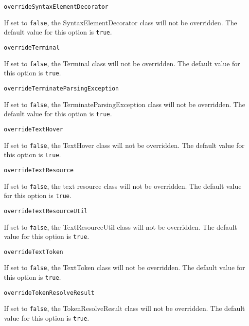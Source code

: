 \noindent\texttt{overrideSyntaxElementDecorator}
\begin{myindentpar}{1cm}
If set to \texttt{false}, the SyntaxElementDecorator class will not be overridden. The default value for this option is \texttt{true}.
\end{myindentpar}

\noindent\texttt{overrideTerminal}
\begin{myindentpar}{1cm}
If set to \texttt{false}, the Terminal class will not be overridden. The default value for this option is \texttt{true}.
\end{myindentpar}

\noindent\texttt{overrideTerminateParsingException}
\begin{myindentpar}{1cm}
If set to \texttt{false}, the TerminateParsingException class will not be overridden. The default value for this option is \texttt{true}.
\end{myindentpar}

\noindent\texttt{overrideTextHover}
\begin{myindentpar}{1cm}
If set to \texttt{false}, the TextHover class will not be overridden. The default value for this option is \texttt{true}.
\end{myindentpar}

\noindent\texttt{overrideTextResource}
\begin{myindentpar}{1cm}
If set to \texttt{false}, the text resource class will not be overridden. The default value for this option is \texttt{true}.
\end{myindentpar}

\noindent\texttt{overrideTextResourceUtil}
\begin{myindentpar}{1cm}
If set to \texttt{false}, the TextResourceUtil class will not be overridden. The default value for this option is \texttt{true}.
\end{myindentpar}

\noindent\texttt{overrideTextToken}
\begin{myindentpar}{1cm}
If set to \texttt{false}, the TextToken class will not be overridden. The default value for this option is \texttt{true}.
\end{myindentpar}

\noindent\texttt{overrideTokenResolveResult}
\begin{myindentpar}{1cm}
If set to \texttt{false}, the TokenResolveResult class will not be overridden. The default value for this option is \texttt{true}.
\end{myindentpar}

